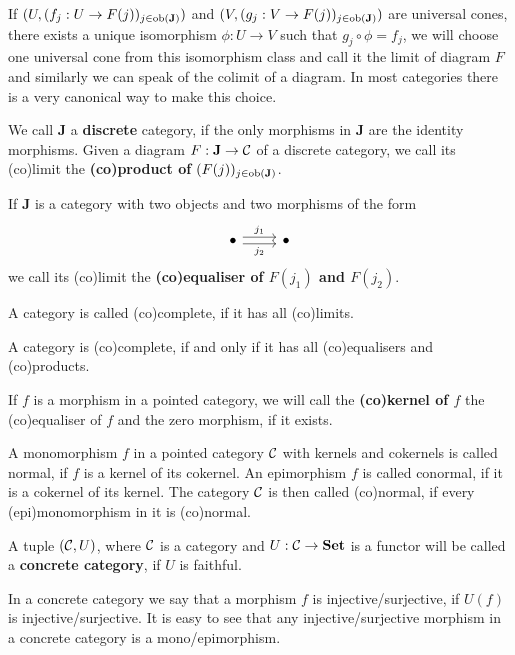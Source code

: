 \begin{remark}
    If $(U, (f_j : U \to F(j))_{j\in\mathbf{\text{ob}(J)}})$ and $(V, (g_j : V \to F(j))_{j\in\mathbf{\text{ob}(J)}})$ are universal cones, 
    there exists a unique isomorphism $\phi: U \to V$ such that $g_j\circ\phi=f_j$, we will choose one universal cone from this isomorphism class 
    and call it the limit of diagram $F$ and similarly we can speak of the colimit of a diagram. In most categories there is a very canonical way to make this choice. 
\end{remark}
\begin{definition}
    We call $\mathbf{J}$ a \textbf{discrete} category, if the only morphisms in $\mathbf{J}$ are the identity morphisms.
    Given a diagram $F:\mathbf{J}\to\mathcal{C}$ of a discrete category, we call its (co)limit the \textbf{(co)product of $(F(j))_{j\in\text{ob}(\mathbf{J})}$}.
\end{definition}
\begin{definition}
    If $\mathbf{J}$ is a category with two objects and two morphisms
    of the form 
        \[\begin{tikzcd}
        \bullet & \bullet
        \arrow["{j_1}", shift left, from=1-1, to=1-2]
        \arrow["{j_2}"', shift right, from=1-1, to=1-2]
    \end{tikzcd}\]
    we call its (co)limit the \textbf{(co)equaliser of $F(j_1)$ and $F(j_2)$}.
\end{definition}
\begin{definition}
    A category is called (co)complete, if it has all (co)limits.
\end{definition}
\begin{theorem}
    A category is (co)complete, if and only if it has all (co)equalisers and (co)products.
\end{theorem}
\begin{definition}
    If $f$ is a morphism in a pointed category, we will call the \textbf{(co)kernel of $f$} the (co)equaliser of $f$ and the zero morphism, if it exists.
\end{definition}
\begin{definition}
    A monomorphism $f$ in a pointed category $\mathcal{C}$ with kernels and cokernels is called normal, if $f$ is a kernel of its cokernel. An 
    epimorphism $f$ is called conormal, if it is a cokernel of its kernel. The category $\mathcal{C}$ is then called 
    (co)normal, if every (epi)monomorphism 
    in it is (co)normal.
\end{definition}
\begin{definition}
    A tuple $(\mathcal{C},U)$, where $\mathcal{C}$ is a category and $U:\mathcal{C}\to\mathbf{Set}$ is a functor will be called a \textbf{concrete category}, if $U$ is faithful.
\end{definition}
    In a concrete category we say that a morphism $f$ is injective/surjective, if $U(f)$ is injective/surjective. It is easy to see 
    that any injective/surjective morphism in a concrete category is a mono/epimorphism.
\iffalse
